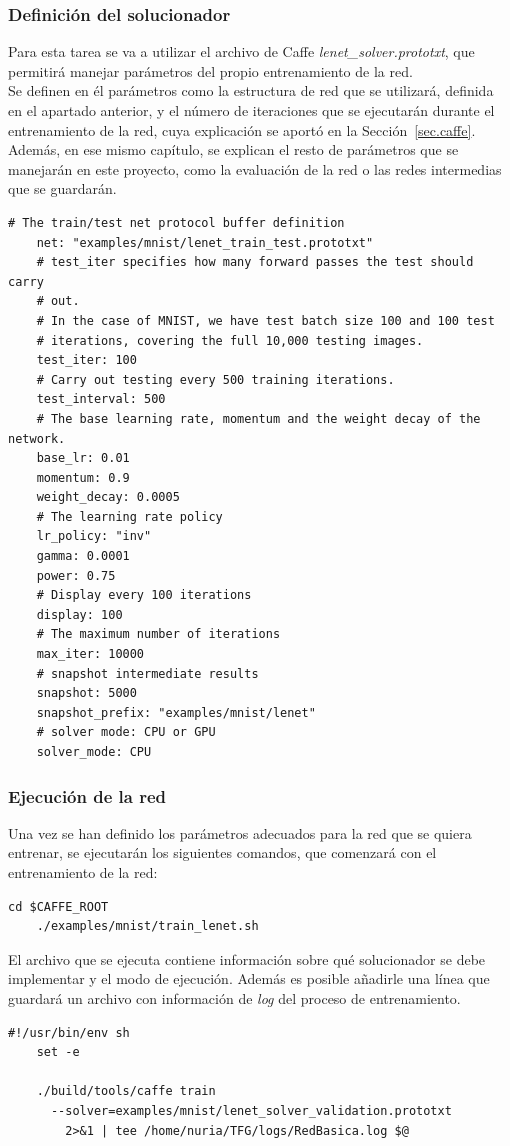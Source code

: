 \subsubsection{Definición del solucionador}
	Para esta tarea se va a utilizar el archivo de Caffe \textit{lenet\_solver.prototxt}, que permitirá manejar parámetros del propio entrenamiento de la red.\\ 
	Se definen en él parámetros como la estructura de red que se utilizará, definida en el apartado anterior, y el número de iteraciones que se ejecutarán durante el entrenamiento de la red, cuya explicación se aportó en la Sección~\ref{sec.caffe}. Además, en ese mismo capítulo, se explican el resto de parámetros que se manejarán en este proyecto, como la evaluación de la red o las redes intermedias que se guardarán.
	\vspace{10pt}
	\begin{lstlisting}[frame=single]
	# The train/test net protocol buffer definition
	net: "examples/mnist/lenet_train_test.prototxt"
	# test_iter specifies how many forward passes the test should carry 
	# out.
	# In the case of MNIST, we have test batch size 100 and 100 test
	# iterations, covering the full 10,000 testing images.
	test_iter: 100
	# Carry out testing every 500 training iterations.
	test_interval: 500
	# The base learning rate, momentum and the weight decay of the network.
	base_lr: 0.01
	momentum: 0.9
	weight_decay: 0.0005
	# The learning rate policy
	lr_policy: "inv"
	gamma: 0.0001
	power: 0.75
	# Display every 100 iterations
	display: 100
	# The maximum number of iterations
	max_iter: 10000
	# snapshot intermediate results
	snapshot: 5000
	snapshot_prefix: "examples/mnist/lenet"
	# solver mode: CPU or GPU
	solver_mode: CPU	
	\end{lstlisting}
\subsubsection{Ejecución de la red}
	Una vez se han definido los parámetros adecuados para la red que se quiera entrenar, se ejecutarán los siguientes comandos, que comenzará con el entrenamiento de la red:
	\vspace{10pt}
	\begin{lstlisting}[frame=single]
	cd $CAFFE_ROOT
	./examples/mnist/train_lenet.sh	
	\end{lstlisting}
	
	El archivo que se ejecuta contiene información sobre qué solucionador se debe implementar y el modo de ejecución. Además es posible añadirle una línea que guardará un archivo con información de \textit{log} del proceso de entrenamiento.
	\vspace{10pt}
	\begin{lstlisting}[frame=single]
	#!/usr/bin/env sh
	set -e
	
	./build/tools/caffe train 
	  --solver=examples/mnist/lenet_solver_validation.prototxt 
	    2>&1 | tee /home/nuria/TFG/logs/RedBasica.log $@
	\end{lstlisting}
	
